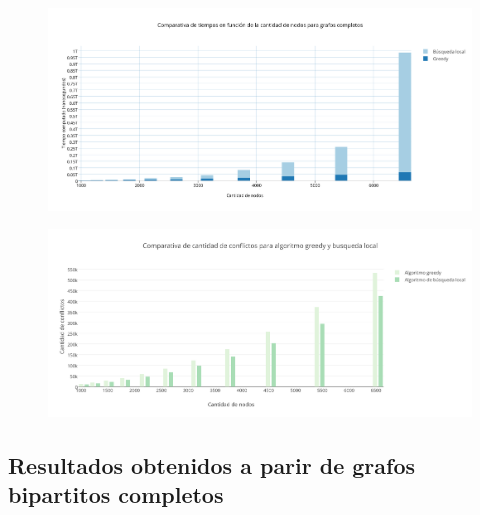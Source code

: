  \begin{figure}[H]
    \begin{center}
  	\includegraphics[width=18cm]{imagenes/Ej5/ComparacionTiemposCompleto.png}
 	\label{ComparacionTiemposCompleto}
    \end{center}
  \end{figure}




 \begin{figure}[H]
    \begin{center}
  	\includegraphics[width=18cm]{imagenes/Ej5/ComparacionConflictosCompleto.png}
 	\label{ComparacionConflictosCompleto}
    \end{center}
  \end{figure}

\subsection {Resultados obtenidos a parir de grafos bipartitos completos} 